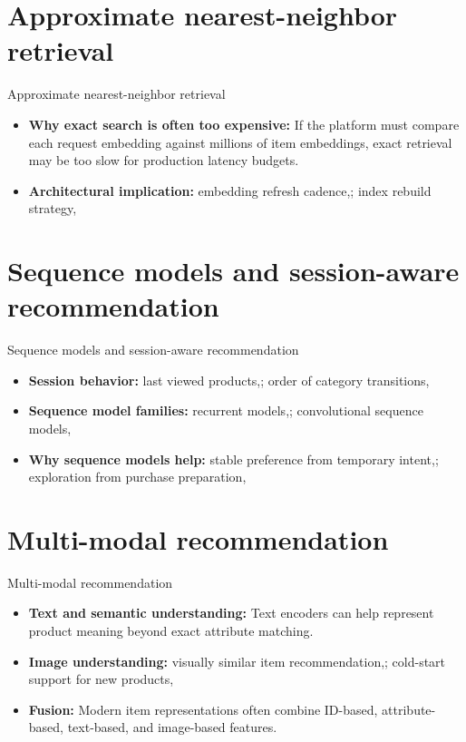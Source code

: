 \documentclass[aspectratio=169]{beamer}
\begin{document}
\section{Approximate nearest-neighbor retrieval}

\begin{frame}{Approximate nearest-neighbor retrieval}
  \begin{itemize}
    \item \textbf{Why exact search is often too expensive:} If the platform must compare each request embedding against millions of item embeddings, exact retrieval may be too slow for production latency budgets.
    \item \textbf{Architectural implication:} embedding refresh cadence,; index rebuild strategy,
  \end{itemize}
\end{frame}

\section{Sequence models and session-aware recommendation}

\begin{frame}{Sequence models and session-aware recommendation}
  \begin{itemize}
    \item \textbf{Session behavior:} last viewed products,; order of category transitions,
    \item \textbf{Sequence model families:} recurrent models,; convolutional sequence models,
    \item \textbf{Why sequence models help:} stable preference from temporary intent,; exploration from purchase preparation,
  \end{itemize}
\end{frame}

\section{Multi-modal recommendation}

\begin{frame}{Multi-modal recommendation}
  \begin{itemize}
    \item \textbf{Text and semantic understanding:} Text encoders can help represent product meaning beyond exact attribute matching.
    \item \textbf{Image understanding:} visually similar item recommendation,; cold-start support for new products,
    \item \textbf{Fusion:} Modern item representations often combine ID-based, attribute-based, text-based, and image-based features.
  \end{itemize}
\end{frame}
\end{document}

